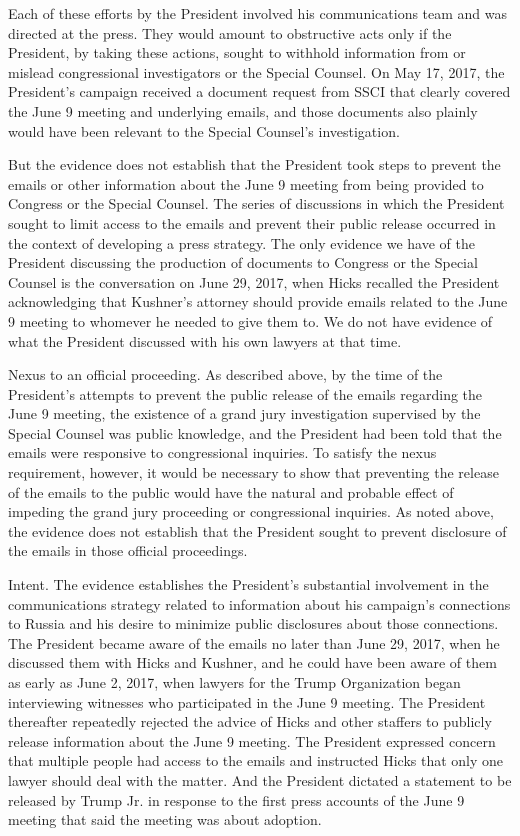 {Each of these efforts by the President involved his communications team and was directed at the press.
They would amount to obstructive acts only if the President, by taking these actions, sought to withhold information from or mislead congressional investigators or the Special Counsel.
On May 17, 2017, the President's campaign received a document request from SSCI that clearly covered the June 9 meeting and underlying emails, and those documents also plainly would have been relevant to the Special Counsel's investigation.

But the evidence does not establish that the President took steps to prevent the emails or other information about the June 9 meeting from being provided to Congress or the Special Counsel.
The series of discussions in which the President sought to limit access to the emails and prevent their public release occurred in the context of developing a press strategy.
The only evidence we have of the President discussing the production of documents to Congress or the Special Counsel is the conversation on June 29, 2017, when Hicks recalled the President acknowledging that Kushner's attorney should provide emails related to the June 9 meeting to whomever he needed to give them to.
We do not have evidence of what the President discussed with his own lawyers at that time.

Nexus to an official proceeding.
As described above, by the time of the President's attempts to prevent the public release of the emails regarding the June 9 meeting, the existence of a grand jury investigation supervised by the Special Counsel was public knowledge, and the President had been told that the emails were responsive to congressional inquiries.
To satisfy the nexus requirement, however, it would be necessary to show that preventing the release of the emails to the public would have the natural and probable effect of impeding the grand jury proceeding or congressional inquiries.
As noted above, the evidence does not establish that the President sought to prevent disclosure of the emails in those official proceedings.

Intent.
The evidence establishes the President's substantial involvement in the communications strategy related to information about his campaign's connections to Russia and his desire to minimize public disclosures about those connections.
The President became aware of the emails no later than June 29, 2017, when he discussed them with Hicks and Kushner, and he could have been aware of them as early as June 2, 2017, when lawyers for the Trump Organization began interviewing witnesses who participated in the June 9 meeting.
The President thereafter repeatedly rejected the advice of Hicks and other staffers to publicly release information about the June 9 meeting.
The President expressed concern that multiple people had access to the emails and instructed Hicks that only one lawyer should deal with the matter.
And the President dictated a statement to be released by Trump Jr. in response to the first press accounts of the June 9 meeting that said the meeting was about adoption.

}
